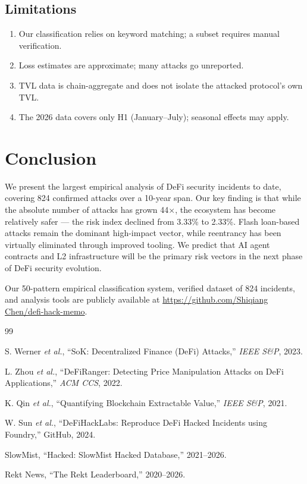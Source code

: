 \documentclass[10pt,conference]{IEEEtran}
\begin{document}
\subsection{Limitations}
\begin{enumerate}
  \item Our classification relies on keyword matching; a subset requires manual verification.
  \item Loss estimates are approximate; many attacks go unreported.
  \item TVL data is chain-aggregate and does not isolate the attacked protocol's own TVL.
  \item The 2026 data covers only H1 (January–July); seasonal effects may apply.
\end{enumerate}

\section{Conclusion}
We present the largest empirical analysis of DeFi security incidents to date, covering 824 confirmed attacks over a 10-year span. Our key finding is that while the absolute number of attacks has grown 44×, the ecosystem has become relatively safer — the risk index declined from 3.33\% to 2.33\%. Flash loan-based attacks remain the dominant high-impact vector, while reentrancy has been virtually eliminated through improved tooling. We predict that AI agent contracts and L2 infrastructure will be the primary risk vectors in the next phase of DeFi security evolution.

Our 50-pattern empirical classification system, verified dataset of 824 incidents, and analysis tools are publicly available at \url{https://github.com/Shiqiang Chen/defi-hack-memo}.


\begin{thebibliography}{99}

S. Werner \emph{et al.}, ``SoK: Decentralized Finance (DeFi) Attacks,'' \emph{IEEE S\&P}, 2023.

L. Zhou \emph{et al.}, ``DeFiRanger: Detecting Price Manipulation Attacks on DeFi Applications,'' \emph{ACM CCS}, 2022.

K. Qin \emph{et al.}, ``Quantifying Blockchain Extractable Value,'' \emph{IEEE S\&P}, 2021.

W. Sun \emph{et al.}, ``DeFiHackLabs: Reproduce DeFi Hacked Incidents using Foundry,'' GitHub, 2024.

SlowMist, ``Hacked: SlowMist Hacked Database,'' 2021--2026.

Rekt News, ``The Rekt Leaderboard,'' 2020--2026.

\end{thebibliography}
\end{document}
